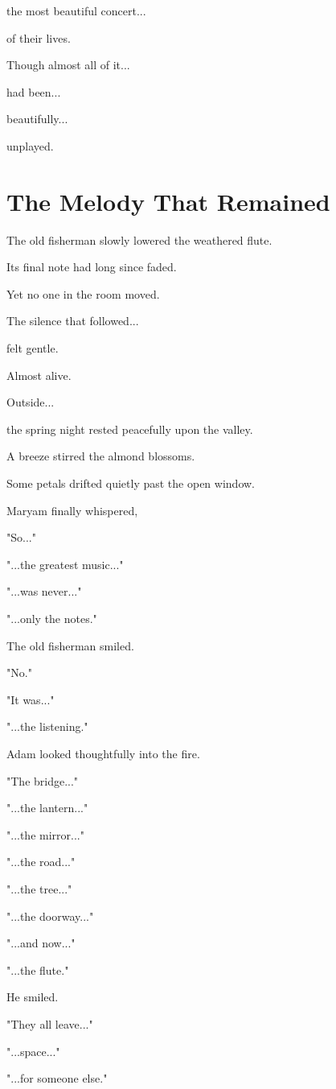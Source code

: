 \documentclass[12pt,openany]{book}
\begin{document}
the most beautiful concert...

of their lives.

Though almost all of it...

had been...

beautifully...

unplayed.
\section*{The Melody That Remained}

The old fisherman slowly lowered the weathered flute.

Its final note had long since faded.

Yet no one in the room moved.

The silence that followed...

felt gentle.

Almost alive.

Outside...

the spring night rested peacefully upon the valley.

A breeze stirred the almond blossoms.

Some petals drifted quietly past the open window.

Maryam finally whispered,

"So..."

"...the greatest music..."

"...was never..."

"...only the notes."

The old fisherman smiled.

"No."

"It was..."

"...the listening."

Adam looked thoughtfully into the fire.

"The bridge..."

"...the lantern..."

"...the mirror..."

"...the road..."

"...the tree..."

"...the doorway..."

"...and now..."

"...the flute."

He smiled.

"They all leave..."

"...space..."

"...for someone else."
\end{document}
